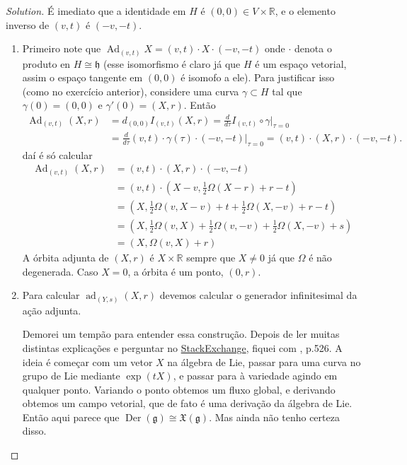 \begin{proof}[Solution]\leavevmode
É imediato que a identidade em $H$ é $(0,0)\in V\times \mathbb{R}$, e o elemento inverso de $(v,t)$  é $(-v,-t)$.
 \begin{enumerate}[label=\alph*.]
	\item Primeiro note que $\operatorname{Ad}_{(v,t)}X=(v,t)\cdot X\cdot(-v,-t)$ onde $\cdot$ denota o produto en $H\cong \mathfrak{h}$ (esse isomorfismo é claro já que $H$ é um espaço vetorial, assim o espaço tangente em $(0,0)$  é isomofo a ele). Para justificar isso (como no exercício anterior), considere uma curva $\gamma\subset H$ tal que $\gamma(0)=(0,0)$ e $\gamma'(0)=(X,r)$. Então 
		\begin{align*}
			\operatorname{Ad}_{(v,t)}(X,r)&=d_{(0,0)}I_{(v,t)}(X,r)=\frac{d}{d\tau}I_{(v,t)}\circ \gamma\Big|_{\tau=0}\\&=\frac{d}{d\tau}(v,t)\cdot \gamma(\tau)\cdot(-v,-t)\Big|_{\tau=0}=(v,t)\cdot (X,r)\cdot(-v,-t).
		\end{align*}
daí é só calcular
		\begin{align*}
			\operatorname{Ad}_{(v,t)}(X,r)&=(v,t)\cdot(X,r)\cdot(-v,-t)\\
			&=(v,t)\cdot\left(X-v, \frac{1}{2}\Omega(X-r)+r-t \right) \\
			&=\left( X,\frac{1}{2}\Omega(v,X-v)+t+\frac{1}{2}\Omega(X,-v)+r-t \right) \\
			&=\left( X,\frac{1}{2}\Omega(v,X)+\frac{1}{2}\Omega(v,-v)+\frac{1}{2}\Omega(X,-v)+s \right) \\
			&=(X,\Omega(v,X)+r)
		\end{align*}
A órbita adjunta de $(X,r)$  é $X\times \mathbb{R}$ sempre que $X\neq 0$ já que $\Omega$ é não degenerada. Caso $X=0$, a  órbita é um ponto, $(0,r)$.

\item Para calcular $\operatorname{ad}_{(Y,s)}(X,r)$ devemos calcular o generador infinitesimal da ação adjunta.

	\begin{remark}\leavevmode
		Demorei um tempão para entender essa construção. Depois de ler muitas distintas explicações e perguntar no \href{https://math.stackexchange.com/questions/4984625/compute-the-derivative-of-adjoint-action-on-heisenberg-group?noredirect=1#comment10681405_4984625}{StackExchange}, fiquei com \cite{lee}, p.526. A ideia é começar com um vetor $X$ na álgebra de Lie, passar para uma curva no grupo de Lie mediante $\operatorname{exp}(tX)$, e passar para à variedade agindo em qualquer ponto. Variando o ponto obtemos um fluxo global, e derivando obtemos um campo vetorial, que de fato é uma derivação da álgebra de Lie. Então aqui parece que $\operatorname{Der}(\mathfrak{g})\cong\mathfrak{X}(\mathfrak{g} )$. Mas ainda não tenho certeza disso.	\end{remark}


\end{enumerate}
\end{proof}
